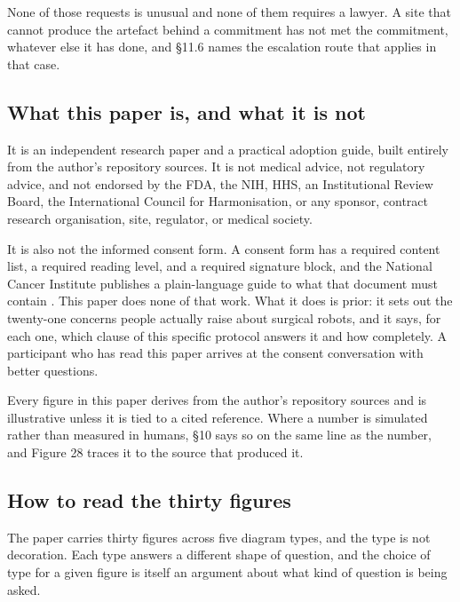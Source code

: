 \noindent None of those requests is unusual and none of them requires a lawyer.
A site that cannot produce the artefact behind a commitment has not met the
commitment, whatever else it has done, and \S 11.6 names the escalation route
that applies in that case.

\subsection{What this paper is, and what it is not}

It is an independent research paper and a practical adoption guide, built
entirely from the author's repository sources. It is not medical advice, not
regulatory advice, and not endorsed by the FDA, the NIH, HHS, an Institutional
Review Board, the International Council for Harmonisation, or any sponsor,
contract research organisation, site, regulator, or medical society.

It is also not the informed consent form. A consent form has a required content
list, a required reading level, and a required signature block, and the National
Cancer Institute publishes a plain-language guide to what that document must
contain \cite{NCIConsent24}. This paper does none of that work. What it does is
prior: it sets out the twenty-one concerns people actually raise about surgical
robots, and it says, for each one, which clause of this specific protocol
answers it and how completely. A participant who has read this paper arrives at
the consent conversation with better questions.

Every figure in this paper derives from the author's repository sources and is
illustrative unless it is tied to a cited reference. Where a number is
simulated rather than measured in humans, \S 10 says so on the same line as the
number, and Figure 28 traces it to the source that produced it.

\subsection{How to read the thirty figures}

The paper carries thirty figures across five diagram types, and the type is not
decoration. Each type answers a different shape of question, and the choice of
type for a given figure is itself an argument about what kind of question is
being asked.

\vspace{0.30em}

